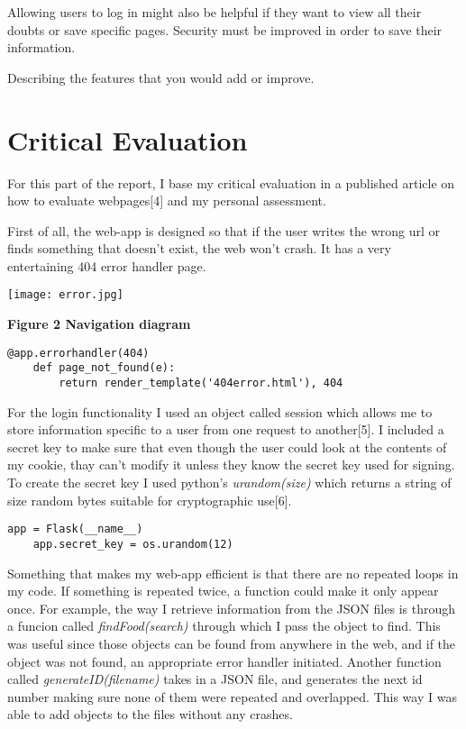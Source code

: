 \documentclass[10pt, a4paper]{article}
\begin{document}
    Allowing users to log in might also be helpful if they want to view all their doubts or save specific pages. Security must be improved in order to save their information.

    Describing the features that you would add or improve.

    \section{Critical Evaluation}

    For this part of the report, I base my critical evaluation in a published article on how to evaluate webpages[4] and my personal assessment.

    First of all, the web-app is designed so that if the user writes the wrong url or finds something that doesn't exist, the web won't crash. It has a very entertaining 404 error handler page.

    \texttt{[image: error.jpg]}

    \textbf{Figure 2 Navigation diagram}
    \vspace{2mm}

    \begin{lstlisting}[caption = How error pages are handled]
    @app.errorhandler(404)
    def page_not_found(e):
        return render_template('404error.html'), 404
    \end{lstlisting}

    For the login functionality I used an object called session which allows me to store information specific to a user from one request to another[5]. I included a secret key to make sure that even though the user could look at the contents of my cookie, thay can't modify it unless they know the secret key used for signing. To create the secret key I used python's \textit{urandom(size)} which returns a string of size random bytes suitable for cryptographic use[6].

    \begin{lstlisting}[caption = How secret key is created]
    app = Flask(__name__)
    app.secret_key = os.urandom(12)
    \end{lstlisting}

    Something that makes my web-app efficient is that there are no repeated loops in my code. If something is repeated twice, a function could make it only appear once. For example, the way I retrieve information from the JSON files is through a funcion called \textit{findFood(search)} through which I pass the object to find. This was useful since those objects can be found from anywhere in the web, and if the object was not found, an appropriate error handler initiated. Another function called \textit{generateID(filename)} takes in a JSON file, and generates the next id number making sure none of them were repeated and overlapped. This way I was able to add objects to the files without any crashes.
\end{document}
